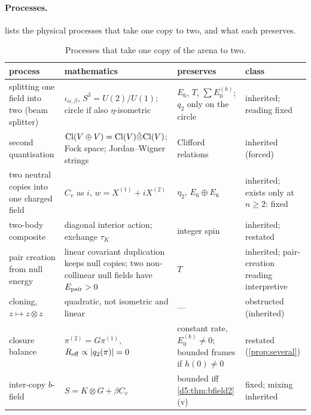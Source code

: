 \paragraph{Processes.}  lists the physical processes that take one copy to two, and what each preserves.

\begin{table}[t]
\centering
\footnotesize
\begin{tabular}{@{}>{\raggedright\arraybackslash}p{3.3cm}>{\raggedright\arraybackslash}p{4.7cm}>{\raggedright\arraybackslash}p{4.3cm}>{\raggedright\arraybackslash}p{2.4cm}@{}}
\toprule
process & mathematics & preserves & class\\
\midrule
splitting one field into two (beam splitter) & $\iota_{\alpha,\beta}$, $S^3=U(2)/U(1)$; circle if also $\eta$-isometric & $E_6$, $T$, $\sum E_0^{(k)}$; $q_2$ only on the circle & inherited; reading fixed\\
second quantisation & $\mathrm{Cl}(V\oplus V)=\mathrm{Cl}(V)\hat\otimes\mathrm{Cl}(V)$; Fock space; Jordan--Wigner strings & Clifford relations & inherited (forced)\\
two neutral copies into one charged field & $C_v$ as $i$, $w=X^{(1)}+iX^{(2)}$ & $\eta_2$, $E_6\oplus E_6$ & inherited; exists only at $n\ge2$: fixed\\
two-body composite & diagonal interior action; exchange $\tau_K$ & integer spin & inherited; restated\\
pair creation from null energy & linear covariant duplication keeps null copies; two non-collinear null fields have $E_{\rm pair}>0$ & $T$ & inherited; pair-creation reading interpretive\\
cloning, $z\mapsto z\otimes z$ & quadratic, not isometric and linear & --- & obstructed (inherited)\\
closure balance & $\pi^{(2)}=G\pi^{(1)}$, $R_{\rm eff}\propto|q_2(\pi)|=0$ & constant rate, $E_0^{(k)}\neq0$; bounded frames if $h(0)\neq0$ & restated (\cref{prop:several})\\
inter-copy $b$-field & $S=K\otimes G+\beta C_v$ & bounded iff \cref{d5:thm:bfield2}(v) & fixed; mixing inherited\\
\bottomrule
\end{tabular}
\caption{Processes that take one copy of the arena to two.}
\label{d5:tab:processes}
\end{table}

